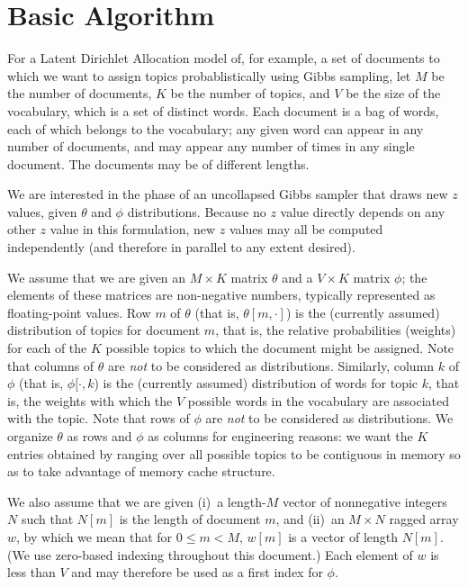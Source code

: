 \documentclass[10pt,nohyperref]{sigplanconf}
\begin{document}
\section{Basic Algorithm}

For a Latent Dirichlet Allocation model of, for example, a set of documents to which we want to assign topics probablistically
using Gibbs sampling, let $M$ be the number of documents,
$K$ be the number of topics, and $V$ be the size of the vocabulary, which is a set of distinct words.
Each document is a bag of words, each of which belongs to the vocabulary;
any given word can appear in any number of documents, and may appear any number of times in any single document.
The documents may be of different lengths.

We are interested in the phase of an uncollapsed Gibbs sampler that draws new $z$ values, given $\theta$ and $\phi$ distributions.
Because no $z$ value directly depends on any other $z$ value in this formulation, new $z$ values may all be computed independently
(and therefore in parallel to any extent desired).

We assume that we are given an $M \times K$ matrix $\theta$ and a $V \times K$ matrix $\phi$; the elements of these matrices are
non-negative numbers, typically represented as floating-point values.
Row $m$ of $\theta$ (that is, $\theta[m, \cdot]$) is the (currently assumed) distribution of topics for document $m$, that is,
the relative probabilities (weights) for each of the $K$ possible topics to which the document might be assigned.
Note that columns of $\theta$ are \emph{not} to be considered as distributions.
Similarly, column $k$ of $\phi$ (that is, $\phi[\cdot,k$) is the (currently assumed) distribution of words for topic $k$,
that is, the weights with which the $V$ possible words in the vocabulary are associated with the topic.
Note that rows of $\phi$ are \emph{not} to be considered as distributions.
We organize $\theta$ as rows and $\phi$ as columns for engineering reasons:
we want the $K$ entries obtained by ranging over all possible topics to be contiguous in memory
so as to take advantage of memory cache structure.

We also assume that we are given (i)~a length-$M$
vector of nonnegative integers $N$ such that $N[m]$ is the length of document $m$, and (ii)~an $M \times N$ ragged array $w$,
by which we mean that for $0 \leq m < M$, $w[m]$ is a vector of length $N[m]$.  (We use zero-based indexing throughout this document.)
Each element of $w$ is less than $V$ and may therefore be used as a first index for $\phi$.
\end{document}
